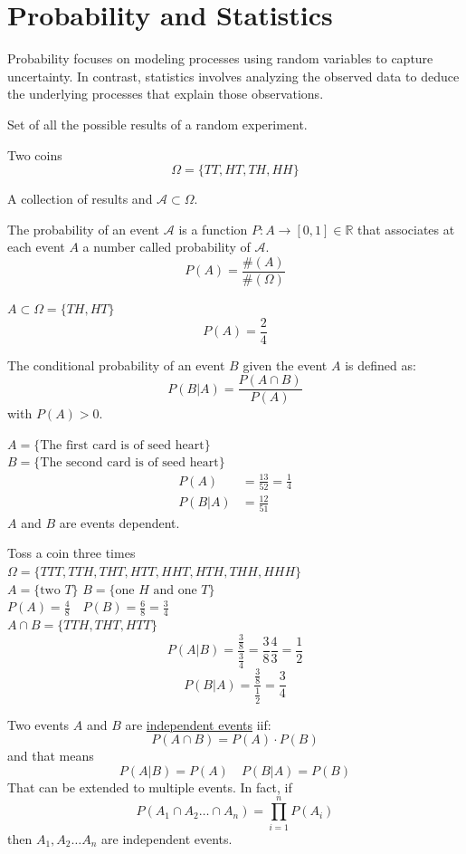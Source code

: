 \documentclass{article}
\begin{document}
\section{Probability and Statistics}
Probability focuses on modeling processes using random variables to capture
uncertainty. In contrast, statistics involves analyzing the observed data to
deduce the underlying processes that explain those observations.
\begin{definition}
    Set of all the possible results of a random experiment.
\end{definition}
\begin{example}
   Two coins 
   $$\Omega=\{TT,HT,TH,HH\}$$
\end{example}
\begin{definition}
    A collection of results and $\mathcal{A}\subset\Omega$.
\end{definition}
\begin{definition}[Probability P]
    The probability of an event $\mathcal{A}$ is a function
    $P:A\to[0,1]\in
    \mathbb{R}$ that associates at each event $A$ a number called probability
    of $\mathcal{A}$.
    $$P(A)=\frac{\#(A)}{\#(\Omega)}$$
\end{definition}
\begin{example}
    $A\subset\Omega=\{TH,HT\}$
    $$P(A)=\frac{2}{4}$$
\end{example}
\begin{definition}
    The conditional probability of an event $B$ given the event $A$ is defined
    as:
    $$P(B|A)=\frac{P(A\cap B)}{P(A)}$$
    with $P(A)>0$.
\end{definition}
\begin{example}
    $A=\{\text{The first card is of seed heart}\}$ \\
    $B=\{\text{The second card is of seed heart}\}$
    $$
    \begin{aligned}
        P(A)&=\frac{13}{52}=\frac{1}{4}\\
        P(B|A)&=\frac{12}{51}
    \end{aligned}
    $$
    $A$ and $B$ are events dependent.
\end{example}
\begin{example}
   Toss a coin three times\\
   $\Omega=\{TTT,TTH,THT,HTT,HHT,HTH,THH,HHH\}$\\ 
   $A=\{\text{two }T\}$
   $B=\{\text{one } H\text{ and one }T\}$\\
   $P(A)=\frac{4}{8}\quad P(B)=\frac{6}{8}=\frac{3}{4}$\\
   $A\cap B=\{TTH,THT,HTT\}$
   $$P(A|B)=\frac{\frac{3}{8}}{\frac{3}{4}}=\frac{3}{8}\frac{4}{3}=\frac{1}{2}$$
   $$P(B|A)=\frac{\frac{3}{8}}{\frac{1}{2}}=\frac{3}{4}$$
\end{example}
\begin{definition}
    Two events $A$ and $B$ are \underline{independent events} iif:
    $$P(A\cap B)=P(A)\cdot P(B)$$
    and that means
    $$P(A|B)=P(A)\quad P(B|A)=P(B)$$
    That can be extended to multiple events. In fact, if
    $$P(A_1\cap A_2\ldots \cap A_n)=\prod_{i=1}^nP(A_i)$$
    then $A_1,A_2\ldots A_n$ are independent events.
\end{definition}
\end{document}
